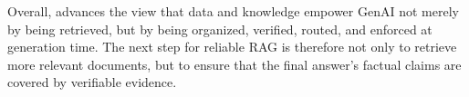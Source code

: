 Overall, \ragname advances the view that data and knowledge empower GenAI not merely by being retrieved, but by being organized, verified, routed, and enforced at generation time. The next step for reliable RAG is therefore not only to retrieve more relevant documents, but to ensure that the final answer's factual claims are covered by verifiable evidence.

